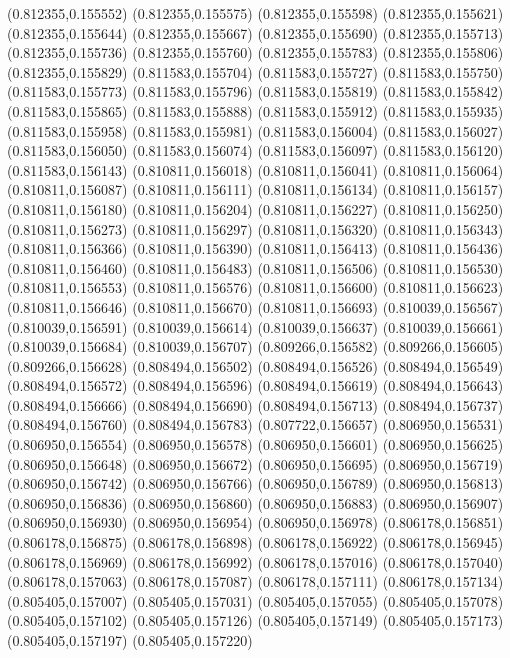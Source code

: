 (0.812355,0.155552)
(0.812355,0.155575)
(0.812355,0.155598)
(0.812355,0.155621)
(0.812355,0.155644)
(0.812355,0.155667)
(0.812355,0.155690)
(0.812355,0.155713)
(0.812355,0.155736)
(0.812355,0.155760)
(0.812355,0.155783)
(0.812355,0.155806)
(0.812355,0.155829)
(0.811583,0.155704)
(0.811583,0.155727)
(0.811583,0.155750)
(0.811583,0.155773)
(0.811583,0.155796)
(0.811583,0.155819)
(0.811583,0.155842)
(0.811583,0.155865)
(0.811583,0.155888)
(0.811583,0.155912)
(0.811583,0.155935)
(0.811583,0.155958)
(0.811583,0.155981)
(0.811583,0.156004)
(0.811583,0.156027)
(0.811583,0.156050)
(0.811583,0.156074)
(0.811583,0.156097)
(0.811583,0.156120)
(0.811583,0.156143)
(0.810811,0.156018)
(0.810811,0.156041)
(0.810811,0.156064)
(0.810811,0.156087)
(0.810811,0.156111)
(0.810811,0.156134)
(0.810811,0.156157)
(0.810811,0.156180)
(0.810811,0.156204)
(0.810811,0.156227)
(0.810811,0.156250)
(0.810811,0.156273)
(0.810811,0.156297)
(0.810811,0.156320)
(0.810811,0.156343)
(0.810811,0.156366)
(0.810811,0.156390)
(0.810811,0.156413)
(0.810811,0.156436)
(0.810811,0.156460)
(0.810811,0.156483)
(0.810811,0.156506)
(0.810811,0.156530)
(0.810811,0.156553)
(0.810811,0.156576)
(0.810811,0.156600)
(0.810811,0.156623)
(0.810811,0.156646)
(0.810811,0.156670)
(0.810811,0.156693)
(0.810039,0.156567)
(0.810039,0.156591)
(0.810039,0.156614)
(0.810039,0.156637)
(0.810039,0.156661)
(0.810039,0.156684)
(0.810039,0.156707)
(0.809266,0.156582)
(0.809266,0.156605)
(0.809266,0.156628)
(0.808494,0.156502)
(0.808494,0.156526)
(0.808494,0.156549)
(0.808494,0.156572)
(0.808494,0.156596)
(0.808494,0.156619)
(0.808494,0.156643)
(0.808494,0.156666)
(0.808494,0.156690)
(0.808494,0.156713)
(0.808494,0.156737)
(0.808494,0.156760)
(0.808494,0.156783)
(0.807722,0.156657)
(0.806950,0.156531)
(0.806950,0.156554)
(0.806950,0.156578)
(0.806950,0.156601)
(0.806950,0.156625)
(0.806950,0.156648)
(0.806950,0.156672)
(0.806950,0.156695)
(0.806950,0.156719)
(0.806950,0.156742)
(0.806950,0.156766)
(0.806950,0.156789)
(0.806950,0.156813)
(0.806950,0.156836)
(0.806950,0.156860)
(0.806950,0.156883)
(0.806950,0.156907)
(0.806950,0.156930)
(0.806950,0.156954)
(0.806950,0.156978)
(0.806178,0.156851)
(0.806178,0.156875)
(0.806178,0.156898)
(0.806178,0.156922)
(0.806178,0.156945)
(0.806178,0.156969)
(0.806178,0.156992)
(0.806178,0.157016)
(0.806178,0.157040)
(0.806178,0.157063)
(0.806178,0.157087)
(0.806178,0.157111)
(0.806178,0.157134)
(0.805405,0.157007)
(0.805405,0.157031)
(0.805405,0.157055)
(0.805405,0.157078)
(0.805405,0.157102)
(0.805405,0.157126)
(0.805405,0.157149)
(0.805405,0.157173)
(0.805405,0.157197)
(0.805405,0.157220)
